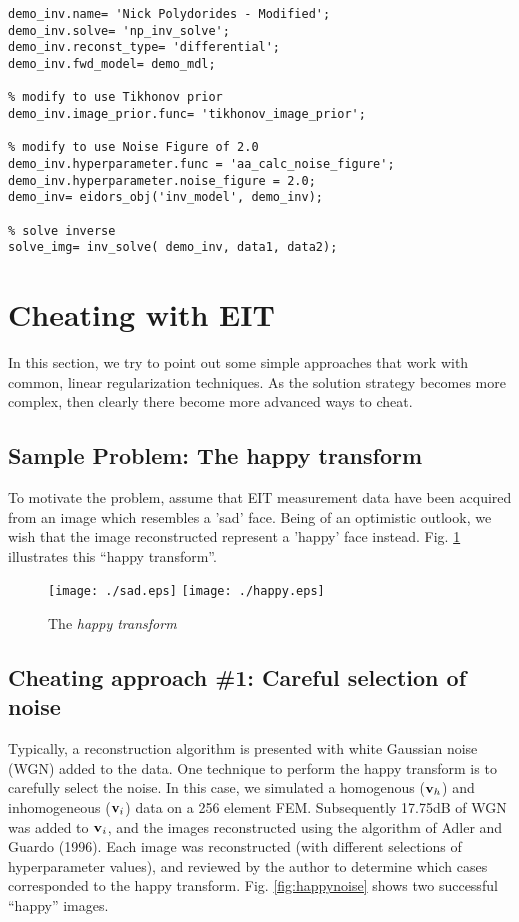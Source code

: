 \documentclass[12pt]{iopart}
\begin{document}
\begin{verbatim}
demo_inv.name= 'Nick Polydorides - Modified';
demo_inv.solve= 'np_inv_solve';
demo_inv.reconst_type= 'differential';
demo_inv.fwd_model= demo_mdl;

% modify to use Tikhonov prior
demo_inv.image_prior.func= 'tikhonov_image_prior';

% modify to use Noise Figure of 2.0
demo_inv.hyperparameter.func = 'aa_calc_noise_figure';
demo_inv.hyperparameter.noise_figure = 2.0;
demo_inv= eidors_obj('inv_model', demo_inv);

% solve inverse
solve_img= inv_solve( demo_inv, data1, data2);
\end{verbatim}

\section{
 Cheating with EIT
}

In this section, we try to point out some
simple approaches that work with common, linear
regularization techniques. As the solution
strategy becomes more complex, then clearly there
become more advanced ways to cheat.

\subsection{
Sample Problem: The happy transform
}
To motivate the problem, assume that EIT measurement
data have been acquired from an image which resembles
a 'sad' face. Being of an optimistic outlook, we wish
that the image reconstructed represent a 'happy' face
instead. Fig. \ref{fig:happytransform}
illustrates this ``happy transform''.

%
%
\begin{figure}[th]
\begin{flushright}
\texttt{[image: ./sad.eps]}
\texttt{[image: ./happy.eps]}
\caption{\small The 
{\em happy transform}
 }
 \label{fig:happytransform}
\end{flushright}
\end{figure}

\subsection{ Cheating approach \#1:
 Careful selection of noise }

Typically, a reconstruction algorithm is presented
with white Gaussian noise (WGN) added to the data. One
technique to perform the happy transform is to
carefully select the noise.
In this case, we simulated a homogenous (${\bf v}_h$)
and inhomogeneous (${\bf v}_i$) data on a 256
element FEM. Subsequently 17.75dB of WGN was added to
${\bf v}_i$, and the images reconstructed using
the algorithm of Adler and Guardo (1996).
Each image was reconstructed (with different selections of
hyperparameter values), and reviewed by the author to determine which cases
corresponded to the happy transform.
Fig. \ref{fig:happynoise} shows two successful
``happy'' images.
\end{document}
